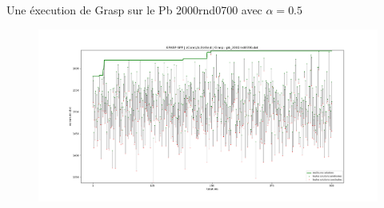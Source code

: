 \vspace{5mm}
\noindent
{}
\vspace{2mm}

\begin{example}
  Une éxecution de Grasp sur le Pb 2000rnd0700 avec $\alpha=0.5$
  \begin{figure}[htb!]
    \centering
    \includegraphics[scale=0.37]{fig/Grasppb2000rnd0700.png}
    \label{fig:grasp2000rnd0700}
  \end{figure}
\end{example}




